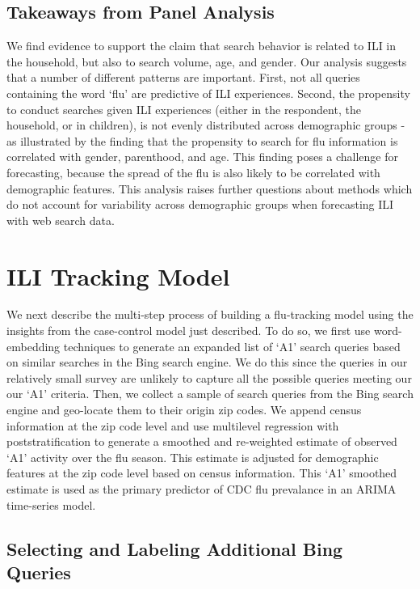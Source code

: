 \documentclass[12pt]{article}
\begin{document}
\subsection{Takeaways from Panel Analysis}

We find evidence to support the claim that search behavior is related to ILI in the household, but also to search volume, age, and gender. Our analysis suggests that a number of different patterns are important. First, not all queries containing the word `flu' are predictive of ILI experiences. Second, the propensity to conduct searches given ILI experiences (either in the respondent, the household, or in children), is not evenly distributed across demographic groups - as illustrated by the finding that the propensity to search for flu information is correlated with gender, parenthood, and age. This finding poses a challenge for forecasting, because the spread of the flu is also likely to be correlated with demographic features. This analysis raises further questions about methods which do not account for variability across demographic groups when forecasting ILI with web search data. 

\section*{ILI Tracking Model}

We next describe the multi-step process of building a flu-tracking model using the insights from the case-control model just described. To do so, we first use word-embedding techniques to generate an expanded list of `A1' search queries based on similar searches in the Bing search engine. We do this since the queries in our relatively small survey are unlikely to capture all the possible queries meeting our our `A1' criteria. Then, we collect a sample of search queries from the Bing search engine and geo-locate them to their origin zip codes. We append census information at the zip code level and use multilevel regression with poststratification to generate a smoothed and re-weighted estimate of observed `A1' activity over the flu season. This estimate is adjusted for demographic features at the zip code level based on census information. This `A1' smoothed estimate is used as the primary predictor of CDC flu prevalance in an ARIMA time-series model. 

\subsection*{Selecting and Labeling Additional Bing Queries}
\end{document}
